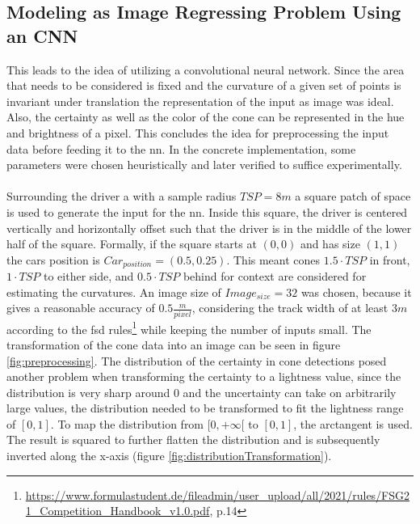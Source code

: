 \subsection{Modeling as Image Regressing Problem Using an CNN}
This leads to the idea of utilizing a convolutional neural network. Since the area that needs to be considered is fixed and the curvature of a given set of points is invariant under translation the representation of the input as image was ideal. Also, the certainty as well as the color of the cone can be represented in the hue and brightness of a pixel. This concludes the idea for preprocessing the input data before feeding it to the \ac{nn}. In the concrete implementation, some parameters were chosen heuristically and later verified to suffice experimentally.\\
\\
Surrounding the driver a with a sample radius $TSP = 8m$ a square patch of space is used to generate the input for the \ac{nn}. Inside this square, the driver is centered vertically and horizontally offset such that the driver is in the middle of the lower half of the square. Formally, if the square starts at $(0,0)$ and has size $(1,1)$ the cars position is $Car_{position}=(0.5,0.25)$. This meant cones $1.5\cdot TSP$ in front, $1\cdot TSP$ to either side, and $0.5\cdot TSP$ behind for context are considered for estimating the curvatures. An image size of $Image_{size}=32$ was chosen, because it gives a reasonable accuracy of $0.5 \frac{m}{pixel}$, considering the track width of at least $3m$ according to the \ac{fsd} rules\footnote{\url{https://www.formulastudent.de/fileadmin/user_upload/all/2021/rules/FSG21_Competition_Handbook_v1.0.pdf}, p.14} while keeping the number of inputs small. The transformation of the cone data into an image can be seen in figure \ref{fig:preprocessing}. The distribution of the certainty in cone detections posed another problem when transforming the certainty to a lightness value, since the distribution is very sharp around 0 and the uncertainty can take on arbitrarily large values, the distribution needed to be transformed to fit the lightness range of $[0,1]$. To map the distribution from $[0,+\infty[$ to $[0,1]$, the arctangent is used. The result is squared to further flatten the distribution and is subsequently inverted along the x-axis (figure \ref{fig:distributionTransformation}). 
